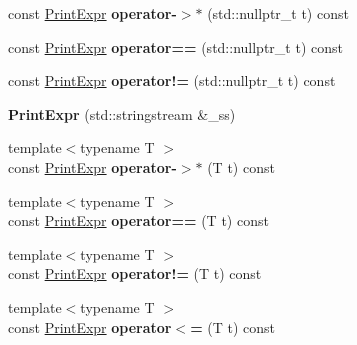 \begin{DoxyCompactItemize}
\item 
\hypertarget{classPrintExpr_ab0ae1579a1ae2d291d1670b164344b25}{const \hyperlink{classPrintExpr}{Print\-Expr} {\bfseries operator-\/$>$$\ast$} (std\-::nullptr\-\_\-t t) const }\label{classPrintExpr_ab0ae1579a1ae2d291d1670b164344b25}

\item 
\hypertarget{classPrintExpr_ae04e978fc3ae6a32ead1e5cdee461574}{const \hyperlink{classPrintExpr}{Print\-Expr} {\bfseries operator==} (std\-::nullptr\-\_\-t t) const }\label{classPrintExpr_ae04e978fc3ae6a32ead1e5cdee461574}

\item 
\hypertarget{classPrintExpr_afe8557361178282251c441176d962140}{const \hyperlink{classPrintExpr}{Print\-Expr} {\bfseries operator!=} (std\-::nullptr\-\_\-t t) const }\label{classPrintExpr_afe8557361178282251c441176d962140}

\item 
\hypertarget{classPrintExpr_ae1ae8ee1a33d8e9e329333c7e494b504}{{\bfseries Print\-Expr} (std\-::stringstream \&\-\_\-ss)}\label{classPrintExpr_ae1ae8ee1a33d8e9e329333c7e494b504}

\item 
\hypertarget{classPrintExpr_a6be8ffbd474b41ef21c643e53c6ea9c4}{{\footnotesize template$<$typename T $>$ }\\const \hyperlink{classPrintExpr}{Print\-Expr} {\bfseries operator-\/$>$$\ast$} (T t) const }\label{classPrintExpr_a6be8ffbd474b41ef21c643e53c6ea9c4}

\item 
\hypertarget{classPrintExpr_ae776115f1d3ec35eb83bad13ebc25929}{{\footnotesize template$<$typename T $>$ }\\const \hyperlink{classPrintExpr}{Print\-Expr} {\bfseries operator==} (T t) const }\label{classPrintExpr_ae776115f1d3ec35eb83bad13ebc25929}

\item 
\hypertarget{classPrintExpr_aee5f096069cab38b8aeeb00b4aa7ba6e}{{\footnotesize template$<$typename T $>$ }\\const \hyperlink{classPrintExpr}{Print\-Expr} {\bfseries operator!=} (T t) const }\label{classPrintExpr_aee5f096069cab38b8aeeb00b4aa7ba6e}

\item 
\hypertarget{classPrintExpr_a39dc1e7b405f0f834e8a45cfd4764853}{{\footnotesize template$<$typename T $>$ }\\const \hyperlink{classPrintExpr}{Print\-Expr} {\bfseries operator$<$=} (T t) const }\label{classPrintExpr_a39dc1e7b405f0f834e8a45cfd4764853}


\end{DoxyCompactItemize}
